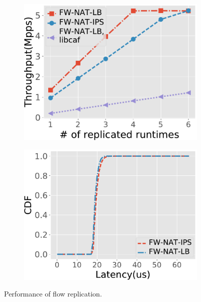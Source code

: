 \begin{figure}[!h]
 \begin{subfigure}[t]{0.49\linewidth}
		\centering
		\includegraphics[width=\columnwidth]{chap-nfvactor/exp-figure/rep_scaling.pdf}
		\caption{}\label{fig:rep_scaling}
	 \end{subfigure}\hfill
	 \begin{subfigure}[t]{0.49\linewidth}
	\centering
		\includegraphics[width=\columnwidth]{chap-nfvactor/exp-figure/rep_latency_pdf.pdf}
		\caption{}\label{fig:rep_latency_pdf} \end{subfigure}
	\caption{Performance of flow replication.}
\label{fig:rep-perf}
\end{figure}

